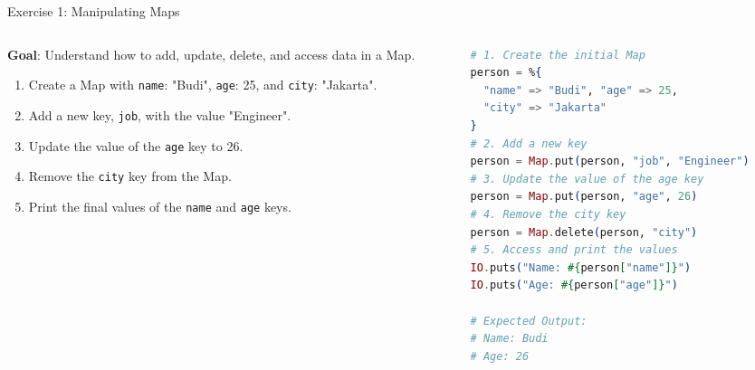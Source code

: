 \documentclass[aspectratio=169, table]{beamer}
\begin{document}
\begin{frame}[fragile]{Exercise 1: Manipulating Maps}
\vspace{20pt}
\begin{columns}
    \begin{column}[t]{0.45\textwidth} %
        \textbf{Goal}: Understand how to add, update, delete, and access data in a Map.
        \begin{enumerate}
            \item Create a Map with \texttt{name}: "Budi", \texttt{age}: 25, and \texttt{city}: "Jakarta".
            \item Add a new key, \texttt{job}, with the value "Engineer".
            \item Update the value of the \texttt{age} key to 26.
            \item Remove the \texttt{city} key from the Map.
            \item Print the final values of the \texttt{name} and \texttt{age} keys.
        \end{enumerate}
    \end{column} %

    \begin{column}[T]{0.55\textwidth} %
        \begin{lstlisting}[language=Elixir, basicstyle=\ttfamily\scriptsize]
# 1. Create the initial Map
person = %{
  "name" => "Budi", "age" => 25, 
  "city" => "Jakarta"
}
# 2. Add a new key
person = Map.put(person, "job", "Engineer")
# 3. Update the value of the age key
person = Map.put(person, "age", 26)
# 4. Remove the city key
person = Map.delete(person, "city")
# 5. Access and print the values
IO.puts("Name: #{person["name"]}")
IO.puts("Age: #{person["age"]}")

# Expected Output:
# Name: Budi
# Age: 26
        \end{lstlisting}
    \end{column} %
\end{columns}
\end{frame}
\end{document}
